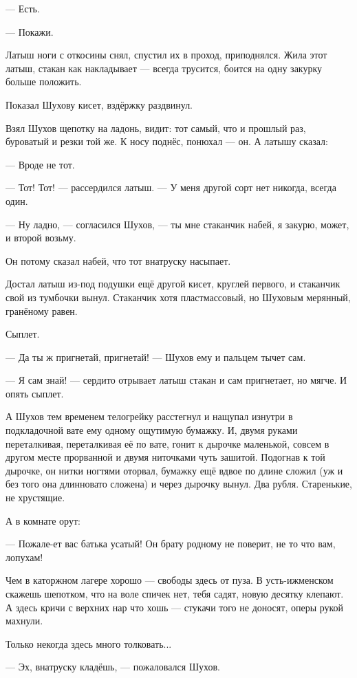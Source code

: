 --- Есть.

--- Покажи.

Латыш ноги с откосины снял, спустил их в проход, приподнялся. Жила этот латыш, стакан как
накладывает --- всегда трусится, боится на одну закурку больше положить.

Показал Шухову кисет, вздёржку раздвинул.

Взял Шухов щепотку на ладонь, видит: тот самый, что и прошлый раз, буроватый и резки той же. К
носу поднёс, понюхал --- он. А латышу сказал:

--- Вроде не тот.

--- Тот! Тот! --- рассердился латыш. --- У меня другой сорт нет никогда, всегда один.

--- Ну ладно, --- согласился Шухов, --- ты мне стаканчик набей, я закурю, может, и второй возьму.

Он потому сказал набей, что тот внатруску насыпает.

Достал латыш из-под подушки ещё другой кисет, круглей первого, и стаканчик свой из тумбочки
вынул. Стаканчик хотя пластмассовый, но Шуховым мерянный, гранёному равен.

Сыплет.

--- Да ты ж пригнетай, пригнетай! --- Шухов ему и пальцем тычет сам.

--- Я сам знай! --- сердито отрывает латыш стакан и сам пригнетает, но мягче. И опять сыплет.

А Шухов тем временем телогрейку расстегнул и нащупал изнутри в подкладочной вате ему одному
ощутимую бумажку. И, двумя руками переталкивая, переталкивая её по вате, гонит к дырочке
маленькой, совсем в другом месте прорванной и двумя ниточками чуть зашитой. Подогнав к той
дырочке, он нитки ногтями оторвал, бумажку ещё вдвое по длине сложил (уж и без того она
длинновато сложена) и через дырочку вынул. Два рубля. Старенькие, не хрустящие.

А в комнате орут:

--- Пожале-ет вас батька усатый! Он брату родному не поверит, не то что вам, лопухам!

Чем в каторжном лагере хорошо --- свободы здесь от пуза. В усть-ижменском скажешь шепотком,
что на воле спичек нет, тебя садят, новую десятку клепают. А здесь кричи с верхних нар что
хошь --- стукачи того не доносят, оперы рукой махнули.

Только некогда здесь много толковать...

--- Эх, внатруску кладёшь, --- пожаловался Шухов.

